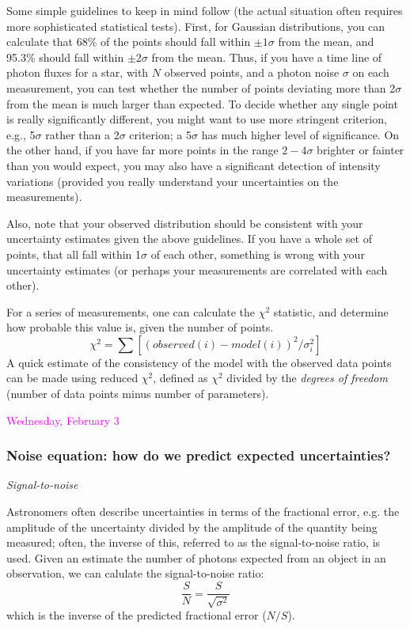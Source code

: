 \documentclass[12pt]{article}
\begin{document}
\noindent Some simple guidelines to keep in mind follow (the actual
situation often requires more sophisticated statistical tests). First,
for Gaussian distributions, you can calculate that 68\% of the points
should fall within $\pm 1\sigma$ from the mean, and 95.3\%
should fall within $\pm 2\sigma$ from the mean. Thus, if you have a
time line of photon fluxes for a star, with $N$ observed points, and a
photon noise $\sigma$ on each measurement, you can test whether the
number of points deviating more than 2$\sigma$ from the mean is much
larger than expected. To decide whether any single point is really
significantly different, you might want to use more stringent
criterion, e.g., 5$\sigma$ rather than a 2$\sigma$ criterion;
a 5$\sigma$ has much higher level of significance. On the other hand, if
you have far more points in the range $2-4\sigma$ brighter or
fainter than you would expect, you may also have a significant
detection of intensity variations (provided you really understand your
uncertainties on the measurements).

Also, note that your observed distribution should be
consistent with your uncertainty estimates given the above guidelines.
If you have a whole set of points, that all fall within 1$\sigma$ of
each other, something is wrong with your uncertainty estimates (or
perhaps your measurements are correlated with each other).

For a series of measurements, one can calculate the
$\chi^{2}$ statistic, and determine how probable this value is,
given the number of points.
    $$ \chi^2 = \sum [(observed(i)-model(i))^2/\sigma_i^2]  $$
A quick estimate of the consistency of the model with the observed
data points can be made using reduced $\chi^{2}$, defined as
$\chi^{2}$ divided by the \emph{degrees of freedom} (number of data points
minus number of parameters).

\textcolor{magenta}{Wednesday, February 3}

\subsubsection*{Noise equation: how do we predict expected
uncertainties?}
\emph{Signal-to-noise}

Astronomers often describe uncertainties in terms of the fractional
error, e.g. the amplitude of the uncertainty divided by the amplitude
of the quantity being measured; often, the inverse of this, referred
to as the signal-to-noise ratio, is used. Given an estimate the number
of photons expected from an object in an observation, we can calulate
the signal-to-noise ratio:
    $$ \frac{S}{N} = \frac{S}{\sqrt{\sigma^2}} $$
which is the inverse of the predicted fractional error ($N/S$).
\end{document}
